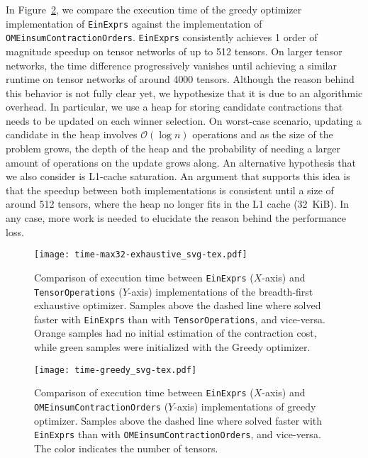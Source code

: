 \documentclass{juliacon}
\begin{document}
In Figure~\ref{fig:greedy:time}, we compare the execution time of the greedy optimizer implementation of \texttt{EinExprs} against the implementation of \texttt{OMEinsumContractionOrders}.
\texttt{EinExprs} consistently achieves 1 order of magnitude speedup on tensor networks of up to 512 tensors.
On larger tensor networks, the time difference progressively vanishes until achieving a similar runtime on tensor networks of around 4000 tensors.
Although the reason behind this behavior is not fully clear yet, we hypothesize that it is due to an algorithmic overhead.
In particular, we use a heap for storing candidate contractions that needs to be updated on each winner selection.
On worst-case scenario, updating a candidate in the heap involves $\mathcal{O}(\log n)$ operations and as the size of the problem grows, the depth of the heap and the probability of needing a larger amount of operations on the update grows along.
An alternative hypothesis that we also consider is L1-cache saturation.
An argument that supports this idea is that the speedup between both implementations is consistent until a size of around 512 tensors, where the heap no longer fits in the L1 cache (32~KiB).
In any case, more work is needed to elucidate the reason behind the performance loss.

\begin{figure}
    \centering
    \texttt{[image: time-max32-exhaustive\_svg-tex.pdf]}
    \caption{Comparison of execution time between \texttt{EinExprs} ($X$-axis) and \texttt{TensorOperations} ($Y$-axis) implementations of the breadth-first exhaustive optimizer. Samples above the dashed line where solved faster with \texttt{EinExprs} than with \texttt{TensorOperations}, and vice-versa. Orange samples had no initial estimation of the contraction cost, while green samples were initialized with the Greedy optimizer.}
    \label{fig:exhaustive:time}
\end{figure}

\begin{figure}
    \centering
    \texttt{[image: time-greedy\_svg-tex.pdf]}
    \caption{Comparison of execution time between \texttt{EinExprs} ($X$-axis) and \texttt{OMEinsumContractionOrders} ($Y$-axis) implementations of greedy optimizer. Samples above the dashed line where solved faster with \texttt{EinExprs} than with \texttt{OMEinsumContractionOrders}, and vice-versa. The color indicates the number of tensors.}
    \label{fig:greedy:time}
\end{figure}
\end{document}
